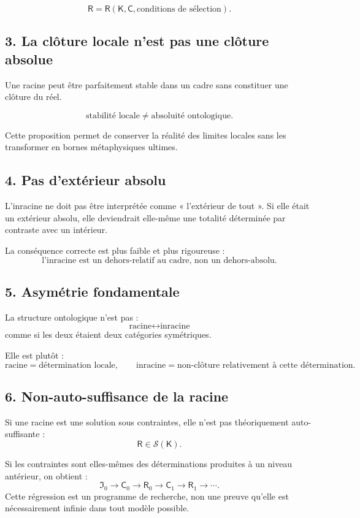 \documentclass[11pt,a4paper]{article}
\newcommand{\Rac}{\mathsf{R}}
\newcommand{\Cadre}{\mathsf{K}}
\newcommand{\Con}{\mathsf{C}}
\newcommand{\Sol}{\mathcal{S}}
\begin{document}
\[
\boxed{
\Rac=\Rac(\Cadre,\Con,\text{conditions de sélection}).
}
\]

\subsection{3. La clôture locale n'est pas une clôture absolue}

Une racine peut être parfaitement stable dans un cadre sans constituer une
clôture du réel.

\[
\boxed{
\text{stabilité locale}\neq\text{absoluité ontologique}.
}
\]

Cette proposition permet de conserver la réalité des limites locales sans
les transformer en bornes métaphysiques ultimes.

\subsection{4. Pas d'extérieur absolu}

L'inracine ne doit pas être interprétée comme « l'extérieur de tout ». Si elle
était un extérieur absolu, elle deviendrait elle-même une totalité déterminée
par contraste avec un intérieur.

La conséquence correcte est plus faible et plus rigoureuse :
\[
\boxed{
\text{l'inracine est un dehors-relatif au cadre, non un dehors-absolu.}
}
\]

\subsection{5. Asymétrie fondamentale}

La structure ontologique n'est pas :
\[
\text{racine}\leftrightarrow\text{inracine}
\]
comme si les deux étaient deux catégories symétriques.

Elle est plutôt :
\[
\boxed{
\text{racine} = \text{détermination locale},
\qquad
\text{inracine} = \text{non-clôture relativement à cette détermination}.
}
\]

\subsection{6. Non-auto-suffisance de la racine}

Si une racine est une solution sous contraintes, elle n'est pas théoriquement
auto-suffisante :
\[
\Rac\in\Sol(\Cadre).
\]

Si les contraintes sont elles-mêmes des déterminations produites à un niveau
antérieur, on obtient :
\[
\mathfrak I_0
\to
\Con_0
\to
\Rac_0
\to
\Con_1
\to
\Rac_1
\to\cdots.
\]
Cette régression est un programme de recherche, non une preuve qu'elle est
nécessairement infinie dans tout modèle possible.
\end{document}
